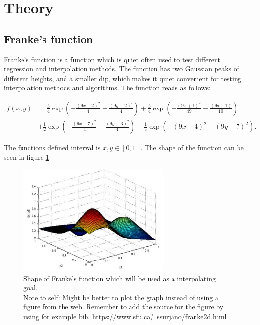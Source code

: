 \documentclass[../main.tex]{subfiles}
\begin{document}
\section{Theory}\label{sec:theory}
  \subsection{Franke's function}
Franke's function is a function which is quiet often used to test different regression and interpolation methods. The function has two Gaussian peaks of different heights, and a smaller dip, which makes it quiet convenient for testing interpolation methods and algorithms. The function reads as follows:

\begin{align*}
f(x,y) &= \frac{3}{4}\exp{\left(-\frac{(9x-2)^2}{4} - \frac{(9y-2)^2}{4}\right)}+\frac{3}{4}\exp{\left(-\frac{(9x+1)^2}{49}- \frac{(9y+1)}{10}\right)} \\
&+\frac{1}{2}\exp{\left(-\frac{(9x-7)^2}{4} - \frac{(9y-3)^2}{4}\right)} -\frac{1}{5}\exp{\left(-(9x-4)^2 - (9y-7)^2\right) }.
\end{align*}

The functions defined interval is $x,y\in[0,1]$. The shape of the function can be seen in figure \ref{fig:frankesplot}

\begin{figure}
\centering
\includegraphics[width = 3in]{frankesfunction_plot.png}
\caption{Shape of Franke's function which will be used as a interpolating goal.
\\Note to self: Might be better to plot the graph instead of using a figure from the web. Remember to add the source for the figure by using for example bib. https://www.sfu.ca/~ssurjano/franke2d.html}
\label{fig:frankesplot}
\end{figure}
\end{document}
